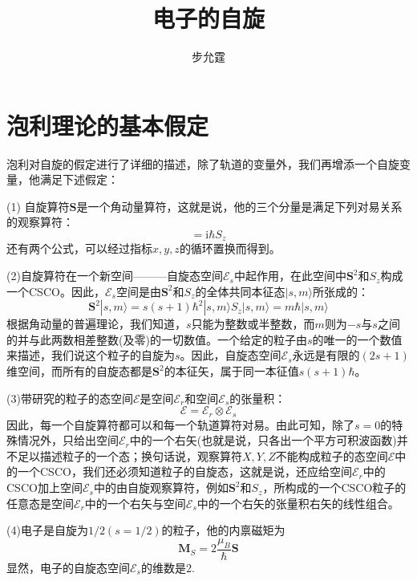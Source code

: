 \documentclass[]{article}
\title{电子的自旋}
\author{步允霆}
\begin{document}
	
	\maketitle
	\tableofcontents
\section{泡利理论的基本假定}
泡利对自旋的假定进行了详细的描述，除了轨道的变量外，我们再增添一个自旋变量，他满足下述假定：\par
(1) 自旋算符$\boldsymbol{S}$是一个角动量算符，这就是说，他的三个分量是满足下列对易关系的观察算符：
\begin{equation}
	[S_x,S_y]=\mathrm{i}\hbar S_z
\end{equation}
还有两个公式，可以经过指标$x,y,z$的循环置换而得到。\par
(2)自旋算符在一个新空间———自旋态空间$\mathscr{E}_s$中起作用，在此空间中$\boldsymbol{S}^2$和$S_z$构成一个CSCO。因此，$\mathscr{E}_s$空间是由$\boldsymbol{S}^2$和$S_z$的全体共同本征态$|s,m\rangle$所张成的：
\begin{subequations}
	\begin{equation}
		\boldsymbol{S}^2|s,m\rangle=s(s+1)\hbar^2|s,m\rangle
	\end{equation}
	\begin{equation}
		S_z|s,m\rangle=m\hbar|s,m\rangle
	\end{equation}
\end{subequations}
根据角动量的普遍理论，我们知道，$s$只能为整数或半整数，而$m$则为$-s$与$s$之间的并与此两数相差整数(及零)的一切数值。一个给定的粒子由$s$的唯一的一个数值来描述，我们说这个粒子的自旋为$s$。因此，自旋态空间$\mathscr{E}_s$永远是有限的$(2s+1)$维空间，而所有的自旋态都是$\boldsymbol{S}^2$的本征矢，属于同一本征值$s(s+1)\hbar$。\par 
(3)带研究的粒子的态空间$\mathscr{E}$是空间$\mathscr{E}_r$和空间$\mathscr{E}_s$的张量积：
\begin{equation}
	\mathscr{E}=\mathscr{E}_r\otimes\mathscr{E}_s
\end{equation}
因此，每一个自旋算符都可以和每一个轨道算符对易。由此可知，除了$s=0$的特殊情况外，只给出空间$\mathscr{E}_r$中的一个右矢(也就是说，只各出一个平方可积波函数)并不足以描述粒子的一个态；换句话说，观察算符$X,Y,Z$不能构成粒子的态空间$\mathscr{E}$中的一个CSCO，我们还必须知道粒子的自旋态，这就是说，还应给空间$\mathscr{E}_r$中的CSCO加上空间$\mathscr{E}_s$中的由自旋观察算符，例如$\boldsymbol{S}^2$和$S_z$，所构成的一个CSCO粒子的任意态是空间$\mathscr{E}_r$中的一个右矢与空间$\mathscr{E}_s$中的一个右矢的张量积右矢的线性组合。\par 
(4)电子是自旋为$1/2(s=1/2)$的粒子，他的内禀磁矩为
\begin{equation}
	\boldsymbol{M}_S=2\dfrac{\mu_B}{\hbar}\boldsymbol{S}
\end{equation}
显然，电子的自旋态空间$\mathscr{E}_s$的维数是2.
\end{document}

